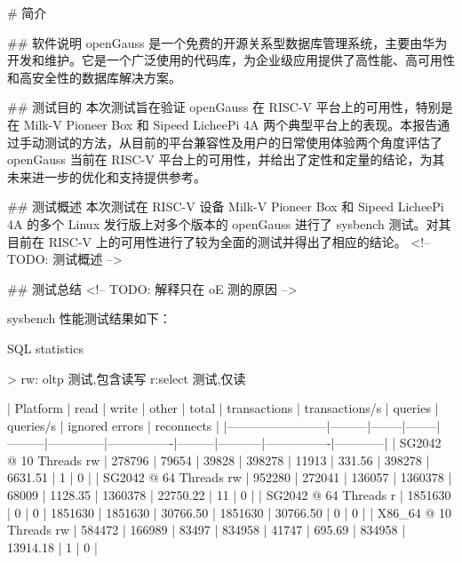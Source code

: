 \documentclass{article}
\begin{document}
\maketitle

\begin{abstract}
\end{abstract}

\thispagestyle{empty} %

\newpage
\tableofcontents

\newpage

\begin{markdown}
# 简介

## 软件说明
openGauss 是一个免费的开源关系型数据库管理系统，主要由华为开发和维护。它是一个广泛使用的代码库，为企业级应用提供了高性能、高可用性和高安全性的数据库解决方案。

## 测试目的
本次测试旨在验证 openGauss 在 RISC-V 平台上的可用性，特别是在 Milk-V Pioneer Box 和 Sipeed LicheePi 4A 两个典型平台上的表现。本报告通过手动测试的方法，从目前的平台兼容性及用户的日常使用体验两个角度评估了 openGauss 当前在 RISC-V 平台上的可用性，并给出了定性和定量的结论，为其未来进一步的优化和支持提供参考。

## 测试概述
本次测试在 RISC-V 设备 Milk-V Pioneer Box 和 Sipeed LicheePi 4A 的多个 Linux 发行版上对多个版本的 openGauss 进行了 sysbench 测试。对其目前在 RISC-V 上的可用性进行了较为全面的测试并得出了相应的结论。
<!-- TODO: 测试概述 -->

## 测试总结
<!-- TODO: 解释只在 oE 测的原因 -->

sysbench 性能测试结果如下：

SQL statistics

> rw: oltp 测试,包含读写 r:select 测试,仅读

| Platform               | read    | write  | other  | total   | transactions | transactions/s | queries | queries/s | ignored errors | reconnects |
|------------------------|---------|--------|--------|---------|--------------|----------------|---------|-----------|----------------|------------|
| SG2042 @ 10 Threads rw | 278796  | 79654  | 39828  | 398278  | 11913        | 331.56         | 398278  | 6631.51   | 1              | 0          |
| SG2042 @ 64 Threads rw | 952280  | 272041 | 136057 | 1360378 | 68009        | 1128.35        | 1360378 | 22750.22  | 11             | 0          |
| SG2042 @ 64 Threads r  | 1851630 | 0      | 0      | 1851630 | 1851630      | 30766.50       | 1851630 | 30766.50  | 0              | 0          |
| X86_64 @ 10 Threads rw | 584472  | 166989 | 83497  | 834958  | 41747        | 695.69         | 834958  | 13914.18  | 1              | 0          |


\end{markdown}
\end{document}
